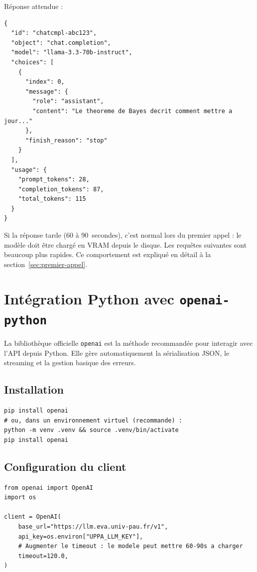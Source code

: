 \documentclass[12pt, a4paper, twoside]{article}
\begin{document}
Réponse attendue :
\begin{lstlisting}[style=jsonstyle, caption={Structure de la réponse (format OpenAI standard)}]
{
  "id": "chatcmpl-abc123",
  "object": "chat.completion",
  "model": "llama-3.3-70b-instruct",
  "choices": [
    {
      "index": 0,
      "message": {
        "role": "assistant",
        "content": "Le theoreme de Bayes decrit comment mettre a jour..."
      },
      "finish_reason": "stop"
    }
  ],
  "usage": {
    "prompt_tokens": 28,
    "completion_tokens": 87,
    "total_tokens": 115
  }
}
\end{lstlisting}

\begin{important}
  Si la réponse tarde (60 à 90~secondes), c'est normal lors du premier appel : le modèle
  doit être chargé en VRAM depuis le disque. Les requêtes suivantes sont beaucoup plus rapides.
  Ce comportement est expliqué en détail à la section~\ref{sec:premier-appel}.
\end{important}

\section{Intégration Python avec \texttt{openai-python}}
\label{sec:python-openai}

La bibliothèque officielle \texttt{openai} est la méthode recommandée pour interagir avec
l'API depuis Python. Elle gère automatiquement la sérialisation JSON, le streaming et la
gestion basique des erreurs.

\subsection{Installation}

\begin{lstlisting}[style=bashstyle, caption={Installation de la bibliothèque openai}]
pip install openai
# ou, dans un environnement virtuel (recommande) :
python -m venv .venv && source .venv/bin/activate
pip install openai
\end{lstlisting}

\subsection{Configuration du client}

\begin{lstlisting}[style=pythonstyle, caption={Initialisation du client OpenAI pointant sur le cluster EVA}]
from openai import OpenAI
import os

client = OpenAI(
    base_url="https://llm.eva.univ-pau.fr/v1",
    api_key=os.environ["UPPA_LLM_KEY"],
    # Augmenter le timeout : le modele peut mettre 60-90s a charger
    timeout=120.0,
)
\end{lstlisting}
\end{document}
